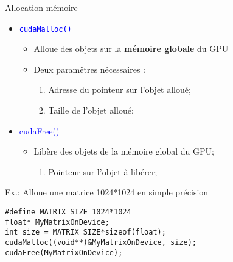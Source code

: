 \documentclass{beamer}
\begin{document}
\begin{frame}[containsverbatim]{Allocation mémoire}
\begin{itemize}
\item \textcolor{blue}{\texttt{cudaMalloc()}}
  \begin{itemize}
  \item Alloue des objets sur la \textbf{mémoire globale} du GPU
  \item Deux paramêtres nécessaires :
    \begin{enumerate}
    \item Adresse du pointeur sur l'objet alloué;
    \item Taille de l'objet alloué;
    \end{enumerate}
  \end{itemize}
\item \textcolor{blue}{cudaFree()}
  \begin{itemize}
  \item Libère des objets de la mémoire global du GPU;
    \begin{enumerate}
    \item Pointeur sur l'objet à libérer;
    \end{enumerate}
  \end{itemize}
\end{itemize}

\begin{exampleblock}{Ex.: Alloue une matrice 1024*1024 en simple précision}
    \begin{lstlisting}
#define MATRIX_SIZE 1024*1024
float* MyMatrixOnDevice;
int size = MATRIX_SIZE*sizeof(float);
cudaMalloc((void**)&MyMatrixOnDevice, size);
cudaFree(MyMatrixOnDevice);
    \end{lstlisting}
\end{exampleblock}
\end{frame}
\end{document}
